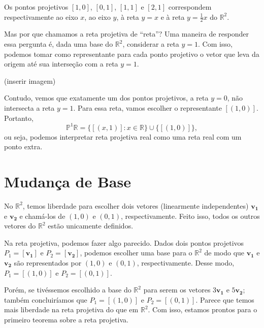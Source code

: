 \begin{exmp}
Os pontos projetivos $[1,0]$, $[0,1]$, $[1,1]$ e $[2,1]$ correspondem respectivamente ao eixo $x$, ao eixo $y$, à reta $y=x$ e à reta $y=\frac{1}{2}x$ do $\mathbb{R}^2$.
\end{exmp}

Mas por que chamamos a reta projetiva de ``reta''? Uma maneira de responder essa pergunta é, dada uma base do $\mathbb{R}^2$, considerar a reta $y=1$. Com isso, podemos tomar como representante para cada ponto projetivo o vetor que leva da origem até sua interseção  com a reta $y=1$.

(inserir imagem)

Contudo, vemos que exatamente um dos pontos projetivos, a reta \(y = 0\), não intersecta a reta \(y = 1\).
Para essa reta, vamos escolher o representante $[(1,0)]$.
Portanto, \[\mathbb{P}^1\mathbb{R} = \{ [(x,1)] : x \in \mathbb{R} \} \cup \{[(1,0)]\},\]
ou seja, podemos interpretar reta projetiva real como uma reta real com um ponto extra.

\section{Mudança de Base}

No \(\mathbb{R}^2\), temos liberdade para escolher dois vetores (linearmente independentes) \(\mathbf{v_1}\) e \(\mathbf{v_2}\) e chamá-los de \((1, 0)\) e \((0, 1)\), respectivamente.
Feito isso, todos os outros vetores do \(\mathbb{R}^2\) estão unicamente definidos.

Na reta projetiva, podemos fazer algo parecido. Dados dois pontos projetivos \(P_1 = [\mathbf{v_1}]\) e \(P_2 = [\mathbf{v_2}]\), podemos escolher uma base para o \(\mathbb{R}^2\) de modo que \(\mathbf{v_1}\) e \(\mathbf{v_2}\) são representados por \((1, 0)\) e \((0, 1)\), respectivamente.
Desse modo, \(P_1 = [(1, 0)]\) e  \(P_2 = [(0, 1)]\).

Porém, se tivéssemos escolhido a base do \(\mathbb{R}^2\) para serem os vetores \(3\mathbf{v_1}\) e  \(5\mathbf{v_2}\); também concluiríamos que \(P_1 = [(1, 0)] \) e \(P_2 = [(0, 1)]\). Parece que temos mais liberdade na reta projetiva do que em \(\mathbb{R}^2\). Com isso, estamos prontos para o primeiro teorema sobre a reta projetiva.

